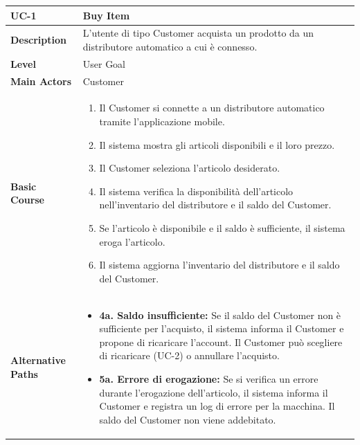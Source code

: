 \begin{table}[H]
\centering
\begin{tabularx}{\textwidth}{|p{2.5cm}|X|}
\hline
\textbf{UC-1} & \textbf{Buy Item} \\
\hline
\textbf{Description} & L'utente di tipo Customer acquista un prodotto da un distributore automatico a cui è connesso. \\
\hline
\textbf{Level} & User Goal \\
\hline
\textbf{Main Actors} & Customer \\
\hline
\textbf{Basic Course} &
\begin{enumerate}
    \item Il Customer si connette a un distributore automatico tramite l'applicazione mobile.
    \item Il sistema mostra gli articoli disponibili e il loro prezzo.
    \item Il Customer seleziona l'articolo desiderato.
    \item Il sistema verifica la disponibilità dell'articolo nell'inventario del distributore  e il saldo del Customer.
    \item Se l'articolo è disponibile e il saldo è sufficiente, il sistema eroga l'articolo.
    \item Il sistema aggiorna l'inventario del distributore e il saldo del Customer.
\end{enumerate} \\
\hline
\textbf{Alternative Paths} &
\begin{itemize}
    \item \textbf{4a. Saldo insufficiente:} Se il saldo del Customer non è sufficiente per l'acquisto, il sistema informa il Customer e propone di ricaricare l'account. Il Customer può scegliere di ricaricare (UC-2) o annullare l'acquisto.
    \item \textbf{5a. Errore di erogazione:} Se si verifica un errore durante l'erogazione dell'articolo, il sistema informa il Customer e registra un log di errore per la macchina. Il saldo del Customer non viene addebitato.
\end{itemize} \\
\hline
\end{tabularx}
\end{table}

